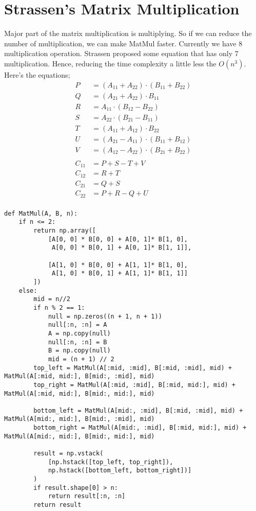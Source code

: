 \documentclass[11pt, a4paper]{article}
\begin{document}
\section{Strassen's Matrix Multiplication}
Major part of the matrix multiplication is multiplying. So if we can reduce the number of multiplication, we can make MatMul faster. Currently we have 8 multiplication operation. Strassen proposed some equation that has only 7 multiplication. Hence, reducing the time complexity a little less the $O(n^3)$. Here's the equations;
\begin{align*}
    P &= (A_{11} + A_{22}) \cdot (B_{11} + B_{22})\\
    Q &= (A_{21} + A_{22}) \cdot B_{11}\\
    R &= A_{11} \cdot (B_{12} - B_{22})\\
    S &= A_{22} \cdot (B_{21} - B_{11} )\\
    T &= (A_{11} + A_{12}) \cdot B_{22}\\
    U &= (A_{21} - A_{11}) \cdot (B_{11} + B_{12})\\
    V &= (A_{12} - A_{22}) \cdot (B_{21} + B_{22})\\
    \\
    C_{11} &= P + S - T + V\\
    C_{12} &= R + T\\
    C_{21} &= Q + S\\
    C_{22} &= P + R - Q + U\\
\end{align*}

\begin{verbatim}
def MatMul(A, B, n):
    if n <= 2:
        return np.array([
            [A[0, 0] * B[0, 0] + A[0, 1]* B[1, 0],
             A[0, 0] * B[0, 1] + A[0, 1]* B[1, 1]],
              
            [A[1, 0] * B[0, 0] + A[1, 1]* B[1, 0],
             A[1, 0] * B[0, 1] + A[1, 1]* B[1, 1]]
        ])
    else:
        mid = n//2
        if n % 2 == 1:
            null = np.zeros((n + 1, n + 1))
            null[:n, :n] = A
            A = np.copy(null)
            null[:n, :n] = B
            B = np.copy(null)
            mid = (n + 1) // 2
        top_left = MatMul(A[:mid, :mid], B[:mid, :mid], mid) + MatMul(A[:mid, mid:], B[mid:, :mid], mid)
        top_right = MatMul(A[:mid, :mid], B[:mid, mid:], mid) + MatMul(A[:mid, mid:], B[mid:, mid:], mid)
              
        bottom_left = MatMul(A[mid:, :mid], B[:mid, :mid], mid) + MatMul(A[mid:, mid:], B[mid:, :mid], mid)
        bottom_right = MatMul(A[mid:, :mid], B[:mid, mid:], mid) + MatMul(A[mid:, mid:], B[mid:, mid:], mid)

        result = np.vstack(
            [np.hstack([top_left, top_right]),
            np.hstack([bottom_left, bottom_right])]
        )
        if result.shape[0] > n:
            return result[:n, :n]
        return result
\end{verbatim}
\end{document}
